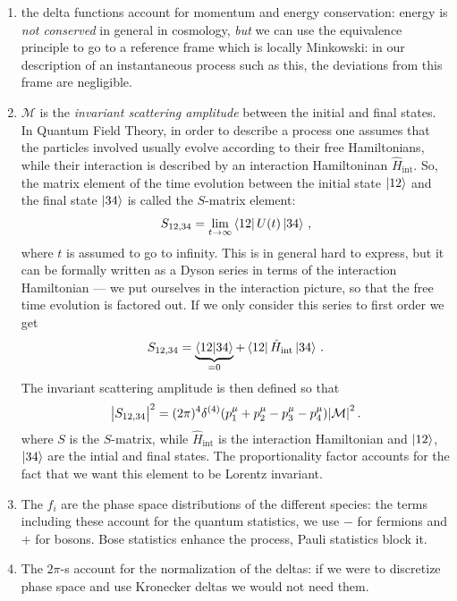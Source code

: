 \documentclass[main.tex]{subfiles}
\begin{document}
\begin{enumerate}
  \item the delta functions account for momentum and energy conservation: energy is \emph{not conserved} in general in cosmology, \emph{but} we can use the equivalence principle to go to a reference frame which is locally Minkowski: in our description of an instantaneous process such as this, the deviations from this frame are negligible.
  \item \(\mathcal{M}\) is the \emph{invariant scattering amplitude} between the initial and final states.
  In Quantum Field Theory, in order to describe a process one assumes that the particles involved usually evolve according to their free Hamiltonians, while their interaction is described by an interaction Hamiltoninan \(\hat{H} _{\text{int}}\). So, the matrix element of the time evolution between the initial state \(\ket{12}\) and the final state \(\ket{34}\) is called the \(S\)-matrix element:
  \begin{align}
  S_{12, 34} = \lim_{t \rightarrow \infty } \bra{12} U(t) \ket{34} 
  \,,
  \end{align}
  where \(t\) is assumed to go to infinity. This is in general hard to express, but it can be formally written as a Dyson series in terms of the interaction Hamiltonian --- we put ourselves in the interaction picture, so that the free time evolution is factored out. If we only consider this series to first order we get 
  \begin{align}
  S_{12, 34} = \underbrace{\braket{12}{34}}_{=0} + \bra{12} \hat{H}_{\text{int}} \ket{34}
  \,.
  \end{align}
  The invariant scattering amplitude is then defined so that 
  \begin{align}
  \abs{S_{12, 34}}^2 = (2 \pi)^{4} \delta^{(4)} (p^{\mu }_{1} + p^{\mu }_{2} - p^{\mu }_{3} - p^{\mu }_{4}) \abs{\mathcal{M}}^2
  \,.
  \end{align}
  where \(S\) is the \(S\)-matrix, while \(\hat{H}_{\text{int}}\) is the interaction Hamiltonian and \(\ket{12}\), \(\ket{34}\) are the intial and final states. 
  The proportionality factor accounts for the fact that we want this element to be Lorentz invariant.
  \item The \(f_{i}\) are the phase space distributions of the different species: the terms including these account for the quantum statistics, we use \(-\) for fermions and \(+\) for bosons. Bose statistics enhance the process, Pauli statistics block it. 
  \item The \(2\pi \)-s account for the normalization of the deltas: if we were to discretize phase space and use Kronecker deltas we would not need them. 

\end{enumerate}
\end{document}
